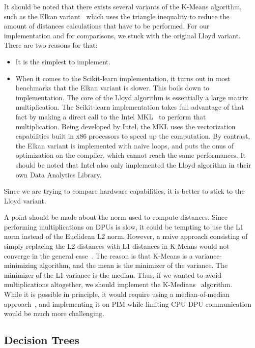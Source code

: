 It should be noted that there exists several variants of the K-Means algorithm, such as the Elkan variant~\cite{elkan2003using} which uses the triangle inequality to reduce the amount of distances calculations that have to be performed. For our implementation and for comparisons, we stuck with the original Lloyd variant. There are two reasons for that:
\begin{itemize}
    \item It is the simplest to implement.
    \item When it comes to the Scikit-learn implementation, it turns out in most benchmarks that the Elkan variant is slower. This boils down to implementation. The core of the Lloyd algorithm is essentially a large matrix multiplication. The Scikit-learn implementation takes full advantage of that fact by making a direct call to the Intel MKL~\cite{mkl} to perform that multiplication. Being developed by Intel, the MKL uses the vectorization capabilities built in x86 processors to speed up the computation. By contrast, the Elkan variant is implemented with naive loops, and puts the onus of optimization on the compiler, which cannot reach the same performances. It should be noted that Intel also only implemented the Lloyd algorithm in their own Data Analytics Library.
\end{itemize}
Since we are trying to compare hardware capabilities, it is better to stick to the Lloyd variant.

A point should be made about the norm used to compute distances. Since performing multiplications on DPUs is slow, it could be tempting to use the L1 norm instead of the Euclidean L2 norm. However, a naive approach consisting of simply replacing the L2 distances with L1 distances in K-Means would not converge in the general case~\cite{bradley1996clustering}. The reason is that K-Means is a variance-minimizing algorithm, and the mean is the minimizer of the variance. The minimizer of the L1-variance is the median. Thus, if we wanted to avoid multiplications altogether, we should implement the K-Medians~\cite{jain1988algorithms} algorithm. While it is possible in principle, it would require using a median-of-median approach~\cite{blum1973time}, and implementing it on PIM while limiting CPU-DPU communication would be much more challenging.

\subsection{Decision Trees}

